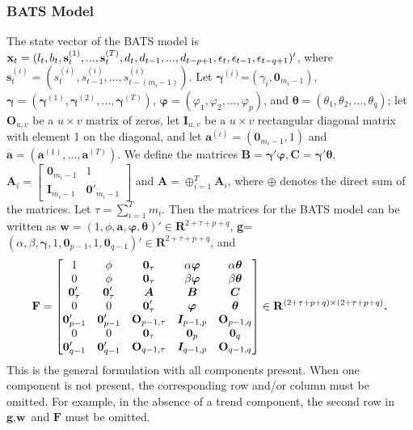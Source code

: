 \documentclass{uwstat572}
\newcommand{\vmadd}[1]{\textbf{\color{red}{#1}}}
\begin{document}
\subsubsection{BATS Model}
\hspace{4ex}The state vector of the BATS model is $\textbf{x}_t=(l_t,b_t,\textbf{s}_t^{(1)},...,\textbf{s}_t^{(T)}, d_t, d_{t-1},..., d_{t-p+1}, \epsilon_t, \epsilon_{t-1},\\ \epsilon_{t-q+1} )'$, 
where $\textbf{s}_t^{(i)}=(s_t^{(i)}, s_{t-1}^{(i)} ,..., s_{t-(m_i-1)}^{(i)}  )$. Let $\bm{\gamma}^{(i)}$=$(\gamma_i, \textbf{0}_{m_i-1})$, $\bm{\gamma}=(\bm{\gamma}^{(1)},\bm{\gamma}^{(2)},...,\bm{\gamma}^{(T)})$, $\bm{\varphi}=(\varphi_1, \varphi_2,..., \varphi_p)$, and $\bm{\theta}=(\theta_1,\theta_2,...,\theta_q)$; let $\textbf{O}_{u,v}$ be a $u \times v$ matrix of zeros, let $\textbf{I}_{u,v}$ be a $u \times v$ rectangular diagonal matrix with element 1 on the diagonal, and let $\textbf{a}^{(i)}=(\textbf{0}_{m_i-1},1)$ and $\textbf{a}=(\textbf{a}^{(1)},...,\textbf{a}^{(T)})$. We define the matrices $\textbf{B}=\bm{\gamma}'\bm{\varphi}, \textbf{C}=\bm{\gamma}'\bm{\theta}$, $\textbf{A}_i=\begin{bmatrix} 
\textbf{0}_{m_i-1} &1 \\ 
\textbf{I}_{m_i-1} & \textbf{0}'_{m_i-1} 
\end{bmatrix}$ and $\textbf{A}=\oplus _{i=1}^T \textbf{A}_i$, where $\oplus$ denotes the direct sum of the matrices. Let $\tau=\sum_{i=1}^{T} m_i$. 
Then the matrices for the BATS model can be written as $\textbf{w}=(1,\phi,\textbf{a}, \bm{\varphi}, \bm{\theta})' \in \mathbf{R}^{2+\tau+p+q}$, \textbf{g}=$(\alpha,\beta,\bm{\gamma}, 1, \textbf{0}_{p-1}, 1, \textbf{0}_{q-1})'\in \mathbf{R}^{2+\tau+p+q}$, and 
\[
\textbf{F}=\begin{bmatrix} 
1 & \phi& \textbf{0}_\tau & \alpha \bm{\varphi} & \alpha \bm{\theta}  \\
0 & \phi& \textbf{0}_\tau & \beta \bm{\varphi} & \beta \bm{\theta}  \\
\textbf{0}'_\tau &  \textbf{0}'_\tau  & \bm{A} & \bm{B} & \bm{C} \\
0 & 0 & \textbf{0}'_\tau & \bm{\varphi} & \bm{\theta}  \\
\bm{0}'_{p-1} & \bm{0}'_{p-1} & \textbf{O}_{p-1,\tau} & \bm{I}_{p-1,p} &\textbf{O}_{p-1,q} \\
0 & 0 &\textbf{0}_\tau & \textbf{0}_p & \textbf{0}_q \\
\bm{0}'_{q-1} & \bm{0}'_{q-1} & \textbf{O}_{q-1,\tau} & \bm{I}_{q-1,p} &\textbf{O}_{q-1,q} \\
\end{bmatrix} \in \mathbf{R}^{(2+\tau+p+q) \times (2+\tau+p+q)}\vmadd{.}
\]
\vspace{2mm} \noindent This is the general formulation with all components present. When one component is not present, the corresponding row and/or column must be omitted. For example, in the absence of a trend component, the second row in $\textbf{g}, \textbf{w}$ and $\textbf{F}$ must be omitted. 
\end{document}
